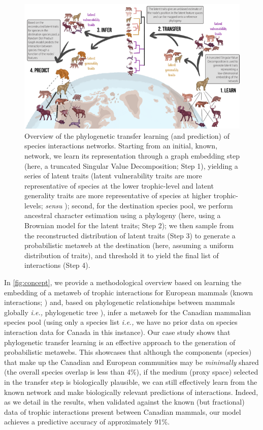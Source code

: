 \begin{figure}[h]
    \centering
    \includegraphics[width=\textwidth]{figures/figure-concept_v2.png}
    \caption{Overview of the phylogenetic transfer learning (and prediction)
of species interactions networks. Starting from an initial, known,
network, we learn its representation through a graph embedding step
(here, a truncated Singular Value Decomposition; Step 1), yielding a
series of latent traits (latent vulnerability traits are more
representative of species at the lower trophic-level and latent
generality traits are more representative of species at higher
trophic-levels; \emph{sensu} \cite{Schoener1989FooWeb}); second, for the
destination species pool, we perform ancestral character estimation
using a phylogeny (here, using a Brownian model for the latent traits;
Step 2); we then sample from the reconstructed distribution of latent
traits (Step 3) to generate a probabilistic metaweb at the destination
(here, assuming a uniform distribution of traits), and threshold it to
yield the final list of interactions (Step 4).}
    \label{fig:concept}
\end{figure}

In \autoref{fig:concept}, we provide a methodological overview based on learning
the embedding of a metaweb of trophic interactions for European mammals
(known interactions; \cite{Maiorano2020TetSpe, Maiorano2020DatTet}) and,
based on phylogenetic relationships between mammals globally \emph{i.e.,}
phylogenetic tree \cite{Upham2019InfMam}), infer a metaweb for the Canadian
mammalian species pool (using only a species list \emph{i.e.,} we have no
prior data on species interaction data for Canada in this instance). Our
case study shows that phylogenetic transfer learning is an effective
approach to the generation of probabilistic metawebs. This showcases
that although the components (species) that make up the Canadian and
European communities may be \emph{minimally} shared (the overall species
overlap is less than 4\%), if the medium (proxy space) selected in the
transfer step is biologically plausible, we can still effectively learn
from the known network and make biologically relevant predictions of
interactions. Indeed, as we detail in the results, when validated
against the known (but fractional) data of trophic interactions present
between Canadian mammals, our model achieves a predictive accuracy of
approximately 91\%.

